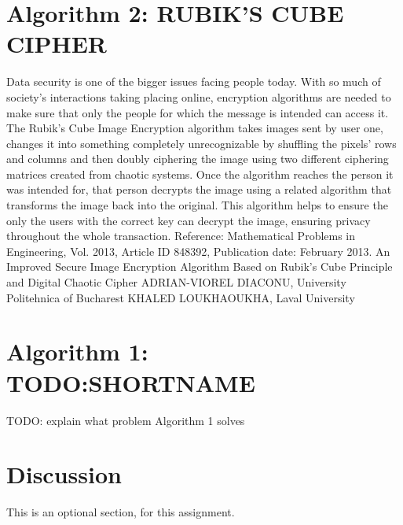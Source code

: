 \documentclass[11pt]{article}
\begin{document}
\section{Algorithm 2: RUBIK'S CUBE CIPHER}
Data security is one of the bigger issues facing people today. With so much of society's interactions taking placing online, encryption algorithms are needed to make sure that only the people for which the message is intended can access it. The Rubik's Cube Image Encryption algorithm takes images sent by user one, changes it into something completely unrecognizable by shuffling the pixels' rows and columns and then doubly ciphering the image using two different ciphering matrices created from chaotic systems. Once the algorithm reaches the person it was intended for, that person decrypts the image using a related algorithm that transforms the image back into the original. This algorithm helps to ensure the only the users with the correct key can decrypt the image, ensuring privacy throughout the whole transaction. 
Reference: Mathematical Problems in Engineering, Vol. 2013, Article ID 848392, Publication date: February 2013. An Improved Secure Image Encryption Algorithm Based on Rubik's Cube Principle and Digital Chaotic Cipher
ADRIAN-VIOREL DIACONU, University Politehnica of Bucharest
KHALED LOUKHAOUKHA, Laval University

\section{Algorithm 1: TODO:SHORTNAME}
TODO: explain what problem Algorithm 1 solves

\section{Discussion}
This is an optional section, for this assignment.
\end{document}

